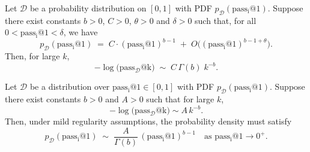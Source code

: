 \begin{theorem}
\label{thm:sufficiency_powerlaw}
Let $\mathcal{D}$ be a probability distribution on $[0,1]$ with PDF $p_{\mathcal{D}}(\operatorname{pass_i@1})$.  
Suppose there exist constants $b > 0$, $C > 0$, $\theta > 0$ and $\delta > 0$ such that, 
for all $0 < \operatorname{pass_i@1} < \delta$, we have 
\[
  p_{\mathcal{D}}(\operatorname{pass_i@1}) \;=\; C \cdot (\operatorname{pass_i@1})^{b-1} \;+\; O\bigl((\operatorname{pass_i@1})^{b-1+\theta}\bigr).
\]
Then, for large $k$,
\[
  -\log\big(\operatorname{pass_{\mathcal{D}}@k}\big)
  \;\sim\;
  C\,\Gamma(b) \;k^{-b}.
\]
\end{theorem}



\begin{theorem}
\label{thm:necessity_powerlaw}
Let $\mathcal{D}$ be a distribution over $\operatorname{pass_i@1} \in [0,1]$ with PDF $p_{\mathcal{D}}(\operatorname{pass_i@1})$.
Suppose there exist constants $b > 0$ and $A > 0$ such that for large $k$,
\[
-\log\big(\operatorname{pass_{\mathcal{D}}@k}\big)
\sim 
A\,k^{-b}.
\]
Then, under mild regularity assumptions, the probability density must satisfy
\[
p_{\mathcal{D}}(\operatorname{pass_i@1})
\;\sim\;
\frac{A}{\Gamma(b)} \, (\operatorname{pass_i@1})^{b - 1}
\quad
\text{as } \operatorname{pass_i@1} \to 0^+.
\]
\end{theorem}

